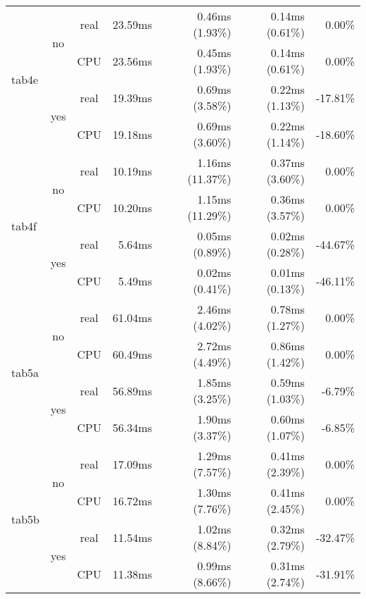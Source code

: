 \documentclass[en]{pracamgr}
\begin{document}
\begin{small}
\begin{longtable}{|l|c|c|r|r|r|r|}
\hline
\multirow{4}{*}{tab4e}    & \multirow{2}{*}{no}  & real & 23.59ms & 0.46ms (1.93\%) & 0.14ms (0.61\%) & 0.00\% \\*
                          &                      & CPU  & 23.56ms & 0.45ms (1.93\%) & 0.14ms (0.61\%) & 0.00\% \\*
                          \cline{2-7}
                          & \multirow{2}{*}{yes} & real & 19.39ms & 0.69ms (3.58\%) & 0.22ms (1.13\%) & -17.81\% \\*
                          &                      & CPU  & 19.18ms & 0.69ms (3.60\%) & 0.22ms (1.14\%) & -18.60\% \\
\hline
\multirow{4}{*}{tab4f}    & \multirow{2}{*}{no}  & real & 10.19ms & 1.16ms (11.37\%) & 0.37ms (3.60\%) & 0.00\% \\*
                          &                      & CPU  & 10.20ms & 1.15ms (11.29\%) & 0.36ms (3.57\%) & 0.00\% \\*
                          \cline{2-7}
                          & \multirow{2}{*}{yes} & real & 5.64ms & 0.05ms (0.89\%) & 0.02ms (0.28\%) & -44.67\% \\*
                          &                      & CPU  & 5.49ms & 0.02ms (0.41\%) & 0.01ms (0.13\%) & -46.11\% \\
\hline
\multirow{4}{*}{tab5a}    & \multirow{2}{*}{no}  & real & 61.04ms & 2.46ms (4.02\%) & 0.78ms (1.27\%) & 0.00\% \\*
                          &                      & CPU  & 60.49ms & 2.72ms (4.49\%) & 0.86ms (1.42\%) & 0.00\% \\*
                          \cline{2-7}
                          & \multirow{2}{*}{yes} & real & 56.89ms & 1.85ms (3.25\%) & 0.59ms (1.03\%) & -6.79\% \\*
                          &                      & CPU  & 56.34ms & 1.90ms (3.37\%) & 0.60ms (1.07\%) & -6.85\% \\
\hline
\multirow{4}{*}{tab5b}    & \multirow{2}{*}{no}  & real & 17.09ms & 1.29ms (7.57\%) & 0.41ms (2.39\%) & 0.00\% \\*
                          &                      & CPU  & 16.72ms & 1.30ms (7.76\%) & 0.41ms (2.45\%) & 0.00\% \\*
                          \cline{2-7}
                          & \multirow{2}{*}{yes} & real & 11.54ms & 1.02ms (8.84\%) & 0.32ms (2.79\%) & -32.47\% \\*
                          &                      & CPU  & 11.38ms & 0.99ms (8.66\%) & 0.31ms (2.74\%) & -31.91\% \\

\end{longtable}
\end{small}
\end{document}
